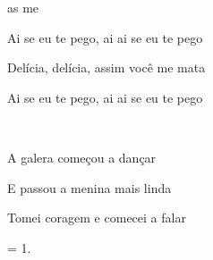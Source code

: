 
\zr

 
as me 

Ai se eu te pego,
ai ai se eu te pego

Delícia, delícia,
assim você me mata

Ai se eu te pego,
ai ai se eu te pego
\kr


    ~   

\zs
{} 

A galera começou a dançar

E passou a menina mais linda

Tomei coragem e comecei a falar
\ks

\zr \kr

\zs
= 1.
\ks

\zr \kr

\zr \kr

\kp


